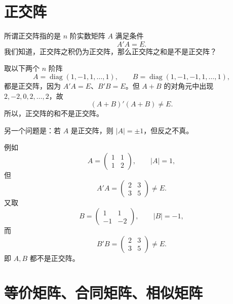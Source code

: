 \section{正交阵}

所谓正交阵指的是 $n$ 阶实数矩阵 $A$ 满足条件
\[
 A'A=E.
\]
我们知道，正交阵之积仍为正交阵，那么正交阵之和是不是正交阵？

取以下两个 $n$ 阶阵
\[
 A=\operatorname{diag}(1,-1,1,\ldots,1),\qquad
 B=\operatorname{diag}(1,-1,-1,1,\ldots,1),
\]
都是正交阵，因为 $A'A=E$、$B'B=E$。但 $A+B$ 的对角元中出现 $2,-2,0,2,\ldots,2$，故
\[
 (A+B)'(A+B)\ne E.
\]
所以，正交阵的和不是正交阵。

另一个问题是：若 $A$ 是正交阵，则 $|A|=\pm1$，但反之不真。

例如
\[
 A=\begin{pmatrix}1&1\\1&2\end{pmatrix},
\qquad |A|=1,
\]
但
\[
 A'A=\begin{pmatrix}2&3\\3&5\end{pmatrix}\ne E.
\]
又取
\[
 B=\begin{pmatrix}1&1\\-1&-2\end{pmatrix},
\qquad |B|=-1,
\]
而
\[
 B'B=\begin{pmatrix}2&3\\3&5\end{pmatrix}\ne E.
\]
即 $A,B$ 都不是正交阵。

\section{等价矩阵、合同矩阵、相似矩阵}

